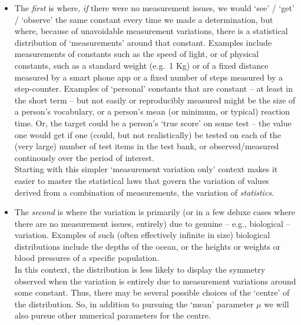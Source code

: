 \documentclass[]{book}
\begin{document}
\begin{itemize}
\item
  The \emph{first} is where, \emph{if} there were no measurement issues, we would `see' / `get' / `observe' the same constant every time we made a determination, but where, because of unavoidable measurement variations, there is a statistical distribution of `measurements' around that constant. Examples include measurements of constants such as the speed of light, or of physical constants, such as a standard weight (e.g.~1 Kg) or of a fixed distance measured by a smart phone app or
  a fixed number of steps measured by a step-counter. Examples of `personal' constants that are constant -- at least in the short term -- but not easily or reproducibly measured might be the size of a person's vocabulary, or a person's mean (or minimum, or typical) reaction time. Or, the target could be a person's `true score' on some test -- the value one would get if one (could, but not realistically) be tested on each of the (very large) number of test items in the test bank, or observed/measured continously over the period of interest.\\
  \hspace*{0.333em}\hspace*{0.333em}\hspace*{0.333em}\hspace*{0.333em}Starting with this simpler `measurement variation only' context makes it easier to master the statistical laws that govern the variation of values derived from a combination of measurements, the variation of \emph{statistics}.
\item
  The \emph{second} is where the variation is primarily (or in a few deluxe cases where there are no measurement issues, entirely) due to genuine -- e.g., biological -- variation.
  Examples of such (often effectively infinite in size) biological distributions include the depths of the ocean, or the heights or weights or blood pressures of a specific population.\\
  \hspace*{0.333em}\hspace*{0.333em}\hspace*{0.333em}\hspace*{0.333em}In this context, the distribution is less likely to display the symmetry observed when the variation is entirely due to measurement variations around some constant. Thus, there may be several possible choices of the `centre' of the distribution. So, in addition to pursuing the `mean' parameter \(\mu\) we will also pursue other numerical parameters for the centre.
\end{itemize}
\end{document}
